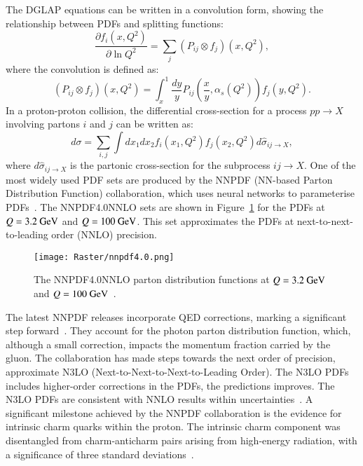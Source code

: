         The DGLAP equations can be written in a convolution form, showing the relationship between PDFs and splitting functions:
        \[
        \frac{\partial f_i(x, Q^2)}{\partial \ln Q^2} = \sum_j \left( P_{ij} \otimes f_j \right)(x, Q^2),
        \]
        where the convolution is defined as:
        \[
        \left( P_{ij} \otimes f_j \right)(x, Q^2) = \int_x^1 \frac{dy}{y} P_{ij}\left(\frac{x}{y}, \alpha_s(Q^2)\right) f_j(y, Q^2).
        \]
        In a proton-proton collision, the differential cross-section for a process \( pp \rightarrow X \) 
        involving partons \( i \) and \( j \) can be written as:
        \[
        d\sigma = \sum_{i,j} \int dx_1 dx_2 f_i(x_1, Q^2) f_j(x_2, Q^2) d\hat{\sigma}_{ij \rightarrow X},
        \]
        where \( d\hat{\sigma}_{ij \rightarrow X} \) is the partonic cross-section for the subprocess \( ij \rightarrow X \).
        One of the most widely used PDF sets are produced by the NNPDF (NN-based Parton Distribution Function) collaboration, 
        which uses neural networks to parameterise PDFs~\cite{Ball_2022}. 
        The NNPDF4.0NNLO sets are shown in Figure~\ref{fig:NNPDF40N2LO} for the PDFs at $Q = 3.2~\text{GeV}$ and $Q = 100~\text{GeV}$.
        This set approximates the PDFs at next-to-next-to-leading order (NNLO) precision.
        \begin{figure}[htbp]
            \centering
            \texttt{[image: Raster/nnpdf4.0.png]}
            \caption{
                The NNPDF4.0NNLO parton distribution functions at $Q = 3.2~\text{GeV}$ and $Q = 100~\text{GeV}$~\cite{Ball_2022}.
            }
            \label{fig:NNPDF40N2LO}
        \end{figure}
        The latest NNPDF releases incorporate QED corrections, marking a significant step forward~\cite{thennpdfcollaboration2024photonsprotonimplicationslhc}. 
        They account for the photon parton distribution function, which, although a small correction, impacts the momentum fraction carried by the gluon. 
        The collaboration has made steps towards the next order of precision, approximate N3LO (Next-to-Next-to-Next-to-Leading Order). 
        The N3LO PDFs includes higher-order corrections in the PDFs, the predictions improves.
        The N3LO PDFs are consistent with NNLO results within uncertainties~\cite{thennpdfcollaboration2024pathn3lopartondistributions}.
        A significant milestone achieved by the NNPDF collaboration is the evidence for intrinsic charm quarks within the proton. 
        The intrinsic charm component was disentangled from charm-anticharm pairs arising from high-energy radiation, with a significance of three standard deviations~\cite{thennpdfcollaboration2022charmintrinsic}.

